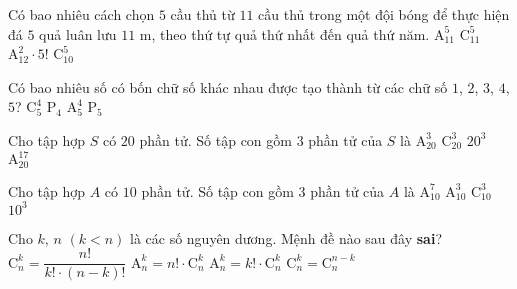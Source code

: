 \begin{ex}%
	Có bao nhiêu cách chọn $5$ cầu thủ từ $11$ cầu thủ trong một đội bóng để thực hiện đá $5$ quả luân lưu $11$ m, theo thứ tự quả thứ nhất đến quả thứ năm.
	\choice
	{\True $\mathrm{A}_{11}^5$}
	{$\mathrm{C}_{11}^5$}
	{$\mathrm{A}_{12}^2 \cdot 5!$}
	{$\mathrm{C}_{10}^5$}
\end{ex}%
\begin{ex}%
	Có bao nhiêu số có bốn chữ số khác nhau được tạo thành từ các chữ số $1$, $2$, $3$, $4$, $5$?
	\choice
	{$\mathrm{C}_5^4$}
	{$\mathrm{P}_4$}
	{\True $\mathrm{A}_5^4$}
	{$\mathrm{P}_5$}
\end{ex}%
\begin{ex}%
Cho tập hợp $S$ có $20$ phần tử. Số tập con gồm $3$ phần tử của $S$ là	
	\choice
	{$\mathrm{A}^3_{20}$}
	{$\mathrm{C}^3_{20}$}
	{$20^3$}
	{$\mathrm{A}^{17}_{20}$}
\end{ex}%
\begin{ex}%
		Cho tập hợp $A$ có $10$ phần tử. Số tập con gồm $3$ phần tử của $A$ là
		\choice
		{$\mathrm{A}_{10}^7$}
		{$\mathrm{A}_{10}^3$}
		{\True $\mathrm{C}_{10}^3$}
		{$10^3$}
	\end{ex}%
\begin{ex}%
	Cho $k$, $n$ $(k<n)$ là các số nguyên dương. Mệnh đề nào sau đây \textbf{sai}?
	\choice
	{$\mathrm{C}_n^k=\dfrac{n!}{k!\cdot(n-k)!}$}
	{\True $\mathrm{A}_n^k=n!\cdot\mathrm{C}_n^k$}
	{$\mathrm{A}_n^k=k!\cdot\mathrm{C}_n^k$}
	{$\mathrm{C}_n^k=\mathrm{C}_n^{n-k}$}
\end{ex}%
